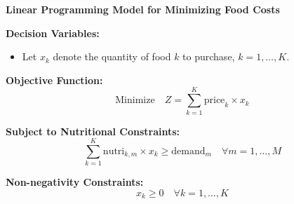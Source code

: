 \documentclass{article}
\begin{document}
\textbf{Linear Programming Model for Minimizing Food Costs}

\textbf{Decision Variables:}
\begin{itemize}
    \item Let \( x_k \) denote the quantity of food \( k \) to purchase, \( k = 1, \ldots, K \).
\end{itemize}

\textbf{Objective Function:}
\[
\text{Minimize} \quad Z = \sum_{k=1}^{K} \text{price}_k \times x_k
\]

\textbf{Subject to Nutritional Constraints:}
\[
\sum_{k=1}^{K} \text{nutri}_{k,m} \times x_k \geq \text{demand}_m \quad \forall m = 1, \ldots, M
\]

\textbf{Non-negativity Constraints:}
\[
x_k \geq 0 \quad \forall k = 1, \ldots, K
\]
\end{document}
